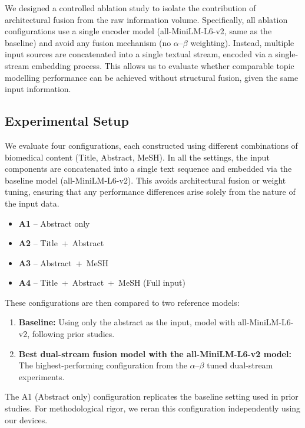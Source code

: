 \documentclass{ieeeaccess}
\begin{document}
We designed a controlled ablation study to isolate the contribution of architectural fusion from the raw information volume. Specifically, all ablation configurations use a single encoder model (all-MiniLM-L6-v2, same as the baseline) and avoid any fusion mechanism (no $\alpha$--$\beta$ weighting). Instead, multiple input sources are concatenated into a single textual stream, encoded via a single-stream embedding process. This allows us to evaluate whether comparable topic modelling performance can be achieved without structural fusion, given the same input information.

\subsection{Experimental Setup}

We evaluate four configurations, each constructed using different combinations of biomedical content (Title, Abstract, MeSH). In all the settings, the input components are concatenated into a single text sequence and embedded via the baseline model (all-MiniLM-L6-v2). This avoids architectural fusion or weight tuning, ensuring that any performance differences arise solely from the nature of the input data.

\begin{itemize}[leftmargin=*]
    \item \textbf{A1} -- Abstract only
    \item \textbf{A2} -- Title~+~Abstract
    \item \textbf{A3} -- Abstract~+~MeSH
    \item \textbf{A4} -- Title~+~Abstract~+~MeSH (Full input)
\end{itemize}

These configurations are then compared to two reference models:
\begin{enumerate}[leftmargin=*,label=\arabic*)]
    \item \textbf{Baseline:} Using only the abstract as the input, model with all-MiniLM-L6-v2, following prior studies.
    \item \textbf{Best dual-stream fusion model with the all-MiniLM-L6-v2 model:} The highest-performing configuration from the $\alpha$--$\beta$ tuned dual-stream experiments.
\end{enumerate}

The A1 (Abstract only) configuration replicates the baseline setting used in prior studies. For methodological rigor, we reran this configuration independently using our devices.
\end{document}
